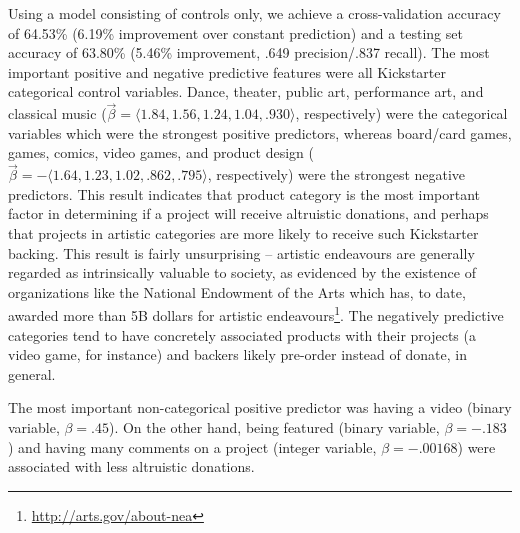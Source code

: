 \documentclass[letterpaper]{article}
\begin{document}
Using a model consisting of controls only, we achieve a cross-validation accuracy of 64.53\% (6.19\% improvement over constant prediction) and a testing set accuracy of 63.80\% (5.46\% improvement, .649 precision/.837 recall). The most important positive and negative predictive features were all Kickstarter categorical control variables. Dance, theater, public art, performance art, and classical music ($\vec{\beta} = \langle 1.84, 1.56, 1.24, 1.04, .930 \rangle$, respectively) were the categorical variables which were the strongest positive predictors, whereas board/card games, games, comics, video games, and product design ($\vec{\beta} = -\langle 1.64, 1.23, 1.02, .862, .795 \rangle$, respectively) were the strongest negative predictors. This result indicates that product category is the most important factor in determining if a project will receive altruistic donations, and perhaps that projects in artistic categories are more likely to receive such Kickstarter backing. This result is fairly unsurprising -- artistic endeavours are generally regarded as intrinsically valuable to society, as evidenced by the existence of organizations like the National Endowment of the Arts which has, to date, awarded more than 5B dollars for artistic endeavours\footnote{\url{http://arts.gov/about-nea}}. The negatively predictive categories tend to have concretely associated products with their projects (a video game, for instance) and backers likely pre-order instead of donate, in general.

The most important non-categorical positive predictor was having a video (binary variable, $\beta = .45$). On the other hand, being featured (binary variable, $\beta = -.183$) and having many comments on a project (integer variable, $\beta = -.00168$) were associated with less altruistic donations.
\end{document}
